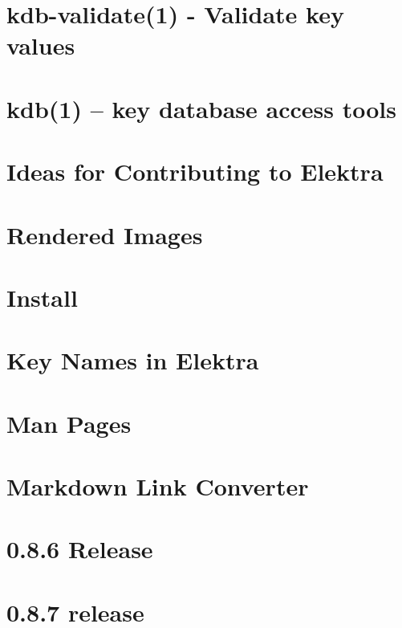 \let\mypdfximage\pdfximage\def\pdfximage{\immediate\mypdfximage}\documentclass[twoside]{book}
\newcommand{\+}{\discretionary{\mbox{\scriptsize$\hookleftarrow$}}{}{}}
\begin{document}
\chapter{kdb-\/validate(1) -\/ Validate key values}
\label{doc_help_kdb-validate_md}

\chapter{kdb(1) -- key database access tools}
\label{doc_help_kdb_md}

\chapter{Ideas for Contributing to Elektra}
\label{doc_IDEAS_md}

\chapter{Rendered Images}
\label{doc_images_README_md}

\chapter{Install}
\label{doc_INSTALL_md}

\chapter{Key Names in Elektra}
\label{doc_KEYNAMES_md}

\chapter{Man Pages}
\label{doc_man_README_md}

\chapter{Markdown Link Converter}
\label{doc_markdownlinkconverter_README_md}

\chapter{0.8.6 Release}
\label{doc_news_2014-06-21_0_8_6_md}

\chapter{0.8.7 release}
\label{doc_news_2014-07-28_0_8_7_md}

\end{document}
